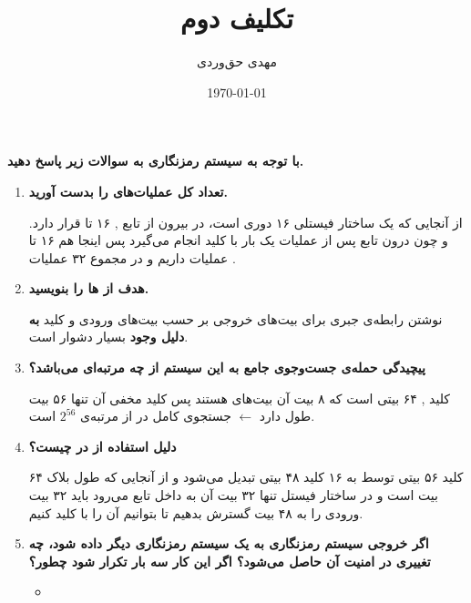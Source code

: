 \documentclass{article}
\title{تکلیف دوم}
\author{مهدی حق‌وردی}
\date{\today}
\begin{document}
\maketitle

\section{}
\textbf{{\large با توجه به سیستم رمزنگاری  به سوالات زیر پاسخ دهید.}}

\begin{enumerate}[label=\alph*)]
\item 
\textbf{تعداد کل عملیات‌های 
را بدست آورید.}

از آنجایی که 
یک ساختار فیستلی ۱۶ دوری است، در بیرون از تابع 
,
۱۶ تا 
قرار دارد. و چون درون تابع
پس از عملیات 
یک بار با کلید 
انجام می‌گیرد پس اینجا هم ۱۶ تا عملیات 
داریم و در مجموع ۳۲ عملیات 
.

\item 
\textbf{هدف از 
ها
را بنویسید.}

نوشتن رابطه‌ی جبری برای بیت‌‌های خروجی بر حسب بیت‌های ورودی و کلید \textbf{به دلیل وجود } بسیار دشوار است.

\item 
\textbf{پیچیدگی حمله‌ی جست‌وجوی جامع به این سیستم از چه مرتبه‌ای می‌باشد؟}

کلید 
,
۶۴ بیتی است که ۸ بیت آن بیت‌های 
هستند پس کلید مخفی آن تنها ۵۶ بیت طول دارد $\leftarrow$ جستجوی کامل در 
از مرتبه‌ی 
$2^{56}$
است.

\item 
\textbf{دلیل استفاده از 
در 
چیست؟}

کلید ۵۶ بیتی 
توسط 
به ۱۶ کلید ۴۸ بیتی تبدیل می‌شود و از آنجایی که طول بلاک 
۶۴ بیت است و در ساختار فیستل تنها ۳۲ بیت آن به داخل تابع 
می‌رود باید ۳۲ بیت ورودی را به ۴۸ بیت گسترش بدهیم تا بتوانیم آن را با کلید 
کنیم.

\item 
\textbf{اگر خروجی سیستم رمزنگاری به یک سیستم رمزنگاری دیگر داده شود، چه تغییری در
امنیت آن حاصل می‌شود؟  اگر این کار سه بار تکرار شود
چطور؟ 
}

\begin{itemize}
\item {}


\end{itemize}
\end{enumerate}
\end{document}
